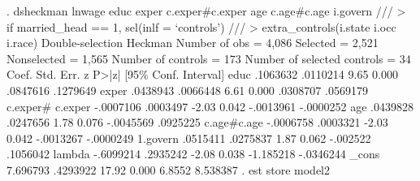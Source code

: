 . dsheckman lnwage educ exper c.exper\#c.exper age c.age\#c.age i.govern    ///
>         if married_head == 1, sel(inlf = `controls')                    ///
>         extra_controls(i.state i.occ i.race)
{\smallskip}
Double-selection Heckman              Number of obs               =      4,086
                                      Selected                    =      2,521
                                      Nonselected                 =      1,565
                                      Number of controls          =        173
                                      Number of selected controls =         34
{\smallskip}
             {\VBAR}      Coef.   Std. Err.      z    P>|z|     [95\% Conf. Interval]
        educ {\VBAR}   .1063632   .0110214     9.65   0.000     .0847616    .1279649
       exper {\VBAR}   .0438943   .0066448     6.61   0.000     .0308707    .0569179
             {\VBAR}
     c.exper\#{\VBAR}
     c.exper {\VBAR}  -.0007106   .0003497    -2.03   0.042    -.0013961   -.0000252
             {\VBAR}
         age {\VBAR}   .0439828   .0247656     1.78   0.076    -.0045569    .0925225
             {\VBAR}
 c.age\#c.age {\VBAR}  -.0006758   .0003321    -2.03   0.042    -.0013267   -.0000249
             {\VBAR}
    1.govern {\VBAR}   .0515411   .0275837     1.87   0.062     -.002522    .1056042
      lambda {\VBAR}  -.6099214   .2935242    -2.08   0.038    -1.185218   -.0346244
       _cons {\VBAR}   7.696793   .4293922    17.92   0.000       6.8552    8.538387
{\smallskip}
. est store model2
{\smallskip}
